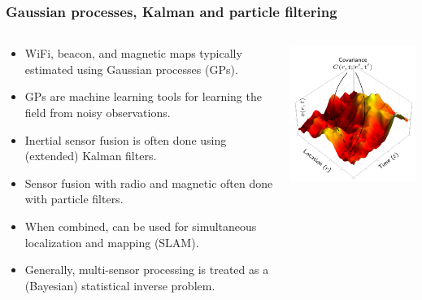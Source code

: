 \documentclass[xcolor=svgnames,english,presentation]{beamer}
\begin{document}
\begin{frame}
  \frametitle{Gaussian processes, Kalman and particle filtering}

  \begin{columns}
  \begin{column}{0.65\textwidth}
  \begin{itemize}[<+->]       
  \item \alert{WiFi, beacon, and magnetic maps} typically estimated using \alert{Gaussian processes} (GPs).
  \item GPs are \alert{machine learning tools} for \alert{learning} the field from noisy observations.
  \item \alert{Inertial sensor fusion} is often done using \alert{(extended) Kalman filters}.
  \item \alert{Sensor fusion} with \alert{radio and magnetic} often done with \alert{particle filters}.
  \item When combined, can be used for \alert{simultaneous localization and mapping (SLAM)}.
  \item Generally, \alert{multi-sensor processing} is treated as a (Bayesian) \alert{statistical inverse problem}.
  \end{itemize}
  \end{column}
  \begin{column}{0.35\textwidth}
  \includegraphics[width=\columnwidth]{TikZ-covariance-figure} \\

\end{column}
\end{columns}
\end{frame}
\end{document}
